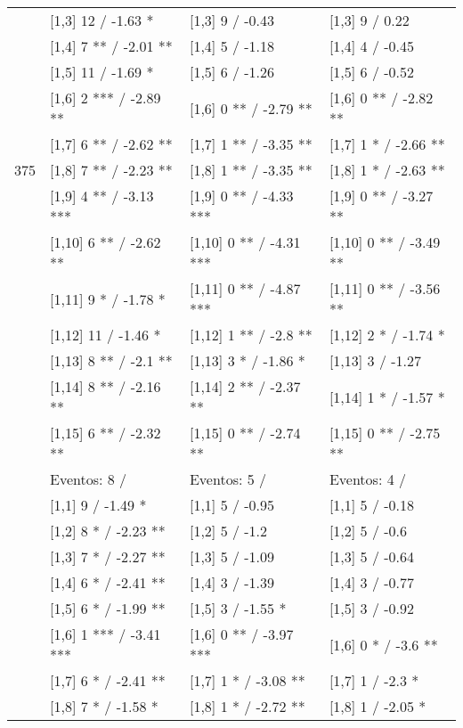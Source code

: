 \begin{table}
\begin{tabular}[t]{llll}
 & {}[1,3] 12  / -1.63 * & {}[1,3] 9  / -0.43 & {}[1,3] 9  / 0.22\\
\addlinespace
 & {}[1,4] 7 ** / -2.01 ** & {}[1,4] 5  / -1.18 & {}[1,4] 4  / -0.45\\
 & {}[1,5] 11  / -1.69 * & {}[1,5] 6  / -1.26 & {}[1,5] 6  / -0.52\\
 & {}[1,6] 2 *** / -2.89 ** & {}[1,6] 0 ** / -2.79 ** & {}[1,6] 0 ** / -2.82 **\\
 & {}[1,7] 6 ** / -2.62 ** & {}[1,7] 1 ** / -3.35 ** & {}[1,7] 1 * / -2.66 **\\
375 & {}[1,8] 7 ** / -2.23 ** & {}[1,8] 1 ** / -3.35 ** & {}[1,8] 1 * / -2.63 **\\
\addlinespace
 & {}[1,9] 4 ** / -3.13 *** & {}[1,9] 0 ** / -4.33 *** & {}[1,9] 0 ** / -3.27 **\\
 & {}[1,10] 6 ** / -2.62 ** & {}[1,10] 0 ** / -4.31 *** & {}[1,10] 0 ** / -3.49 **\\
 & {}[1,11] 9 * / -1.78 * & {}[1,11] 0 ** / -4.87 *** & {}[1,11] 0 ** / -3.56 **\\
 & {}[1,12] 11  / -1.46 * & {}[1,12] 1 ** / -2.8 ** & {}[1,12] 2 * / -1.74 *\\
 & {}[1,13] 8 ** / -2.1 ** & {}[1,13] 3 * / -1.86 * & {}[1,13] 3  / -1.27\\
\addlinespace
 & {}[1,14] 8 ** / -2.16 ** & {}[1,14] 2 ** / -2.37 ** & {}[1,14] 1 * / -1.57 *\\
 & {}[1,15] 6 ** / -2.32 ** & {}[1,15] 0 ** / -2.74 ** & {}[1,15] 0 ** / -2.75 **\\
 & Eventos:  8 / & Eventos:  5 / & Eventos:  4 /\\
 & {}[1,1] 9  / -1.49 * & {}[1,1] 5  / -0.95 & {}[1,1] 5  / -0.18\\
 & {}[1,2] 8 * / -2.23 ** & {}[1,2] 5  / -1.2 & {}[1,2] 5  / -0.6\\
\addlinespace
 & {}[1,3] 7 * / -2.27 ** & {}[1,3] 5  / -1.09 & {}[1,3] 5  / -0.64\\
 & {}[1,4] 6 * / -2.41 ** & {}[1,4] 3  / -1.39 & {}[1,4] 3  / -0.77\\
 & {}[1,5] 6 * / -1.99 ** & {}[1,5] 3  / -1.55 * & {}[1,5] 3  / -0.92\\
 & {}[1,6] 1 *** / -3.41 *** & {}[1,6] 0 ** / -3.97 *** & {}[1,6] 0 * / -3.6 **\\
 & {}[1,7] 6 * / -2.41 ** & {}[1,7] 1 * / -3.08 ** & {}[1,7] 1  / -2.3 *\\
\addlinespace
500 & {}[1,8] 7 * / -1.58 * & {}[1,8] 1 * / -2.72 ** & {}[1,8] 1  / -2.05 *\\

\end{tabular}
\end{table}
